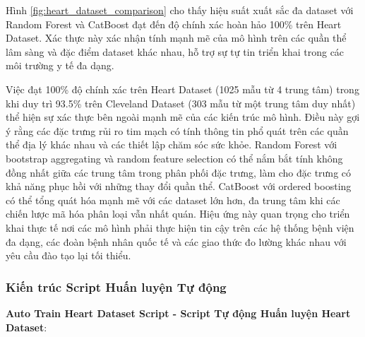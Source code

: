 Hình \ref{fig:heart_dataset_comparison} cho thấy hiệu suất xuất sắc đa dataset với Random Forest và CatBoost đạt đến độ chính xác hoàn hảo 100\% trên Heart Dataset. Xác thực này xác nhận tính mạnh mẽ của mô hình trên các quần thể lâm sàng và đặc điểm dataset khác nhau, hỗ trợ sự tự tin triển khai trong các môi trường y tế đa dạng.

Việc đạt 100\% độ chính xác trên Heart Dataset (1025 mẫu từ 4 trung tâm) trong khi duy trì 93.5\% trên Cleveland Dataset (303 mẫu từ một trung tâm duy nhất) thể hiện sự xác thực bên ngoài mạnh mẽ của các kiến trúc mô hình. Điều này gợi ý rằng các đặc trưng rủi ro tim mạch có tính thông tin phổ quát trên các quần thể địa lý khác nhau và các thiết lập chăm sóc sức khỏe. Random Forest với bootstrap aggregating và random feature selection có thể nắm bắt tính không đồng nhất giữa các trung tâm trong phân phối đặc trưng, làm cho đặc trưng có khả năng phục hồi với những thay đổi quần thể. CatBoost với ordered boosting có thể tổng quát hóa mạnh mẽ với các dataset lớn hơn, đa trung tâm khi các chiến lược mã hóa phân loại vẫn nhất quán. Hiệu ứng này quan trọng cho triển khai thực tế nơi các mô hình phải thực hiện tin cậy trên các hệ thống bệnh viện đa dạng, các đoàn bệnh nhân quốc tế và các giao thức đo lường khác nhau với yêu cầu đào tạo lại tối thiểu.

\subsubsection{Kiến trúc Script Huấn luyện Tự động}

\textbf{Auto Train Heart Dataset Script - Script Tự động Huấn luyện Heart Dataset}:

